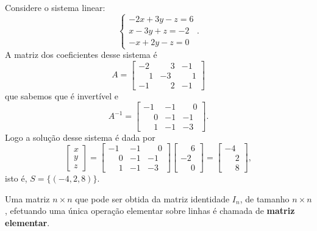 \begin{exemplo}
    Considere o sistema linear:
    \[
        \begin{cases}
            -2x + 3y - z = 6\\
            x - 3y + z = -2\\
            -x + 2y - z = 0
        \end{cases}.
    \]
    A matriz dos coeficientes desse sistema é
    \[
        A = \begin{bmatrix}
            -2 & \phantom{-}3 & -1\\
            \phantom{-}1 & -3 & \phantom{-}1\\
            -1 & \phantom{-}2 & -1
        \end{bmatrix}
    \]
    que sabemos que é invertível e
    \[
        A^{-1} = \begin{bmatrix}
            -1 & -1 & \phantom{-}0\\
            \phantom{-}0 & -1 & -1\\
            \phantom{-}1 & -1 & -3
        \end{bmatrix}.
    \]
    Logo a solução desse sistema é dada por
    \[
        \begin{bmatrix}x\\y\\z\end{bmatrix} =
        \begin{bmatrix}
            -1 & -1 & \phantom{-}0\\
            \phantom{-}0 & -1 & -1\\
            \phantom{-}1 & -1 & -3
        \end{bmatrix}
        \begin{bmatrix}
            \phantom{-}6\\
            -2\\
            \phantom{-}0
        \end{bmatrix} =
        \begin{bmatrix}
            -4\\
            \phantom{-}2\\
            \phantom{-}8
        \end{bmatrix},
    \]
    isto é, $S = \{(-4, 2, 8)\}$.
\end{exemplo}

\begin{definicao}
    Uma matriz $n\times n$ que pode ser obtida da matriz identidade $I_n$, de tamanho $n\times n$, efetuando uma única operação elementar sobre linhas é chamada de \textbf{matriz elementar}.
\end{definicao}


